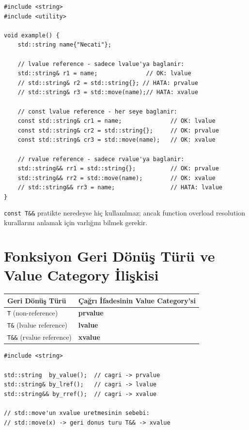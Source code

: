 \documentclass[a4paper,12pt]{article}
\begin{document}
\begin{lstlisting}
#include <string>
#include <utility>

void example() {
    std::string name{"Necati"};

    // lvalue reference - sadece lvalue'ya baglanir:
    std::string& r1 = name;              // OK: lvalue
    // std::string& r2 = std::string{}; // HATA: prvalue
    // std::string& r3 = std::move(name);// HATA: xvalue

    // const lvalue reference - her seye baglanir:
    const std::string& cr1 = name;              // OK: lvalue
    const std::string& cr2 = std::string{};     // OK: prvalue
    const std::string& cr3 = std::move(name);   // OK: xvalue

    // rvalue reference - sadece rvalue'ya baglanir:
    std::string&& rr1 = std::string{};          // OK: prvalue
    std::string&& rr2 = std::move(name);        // OK: xvalue
    // std::string&& rr3 = name;                // HATA: lvalue
}
\end{lstlisting}

\begin{notebox}
\texttt{const T\&\&} pratikte neredeyse hiç kullanılmaz; ancak function overload resolution kurallarını anlamak için varlığını bilmek gerekir.
\end{notebox}

\section{Fonksiyon Geri Dönüş Türü ve Value Category İlişkisi}

\begin{table}[h]
\centering
\begin{tabular}{@{}ll@{}}
\toprule
\textbf{Geri Dönüş Türü} & \textbf{Çağrı İfadesinin Value Category'si} \\
\midrule
\texttt{T} (non-reference)     & \textbf{prvalue} \\
\texttt{T\&} (lvalue reference) & \textbf{lvalue}  \\
\texttt{T\&\&} (rvalue reference) & \textbf{xvalue}  \\
\bottomrule
\end{tabular}
\end{table}

\begin{lstlisting}
#include <string>

std::string  by_value();  // cagri -> prvalue
std::string& by_lref();   // cagri -> lvalue
std::string&& by_rref();  // cagri -> xvalue

// std::move'un xvalue uretmesinin sebebi:
// std::move(x) -> geri donus turu T&& -> xvalue
\end{lstlisting}
\end{document}
